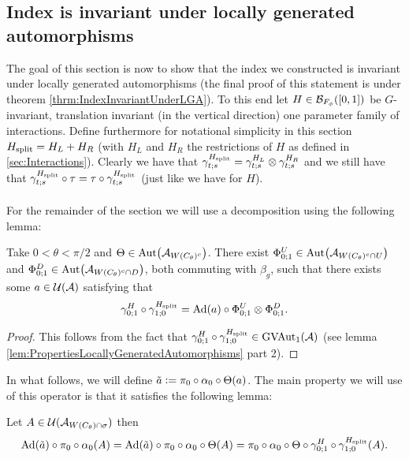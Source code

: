\documentclass[11pt,a4paper,twoside]{article}
\numberwithin{equation}{section}
\begin{document}
\subsection{Index is invariant under locally generated automorphisms}\label{sec:IndexInvariantUnderLGA}
The goal of this section is now to show that the index we constructed is invariant under locally generated automorphisms (the final proof of this statement is under theorem \ref{thrm:IndexInvariantUnderLGA}). To this end let $H\in\mathcal B_{F_\phi}([0,1])$ be $G$-invariant, translation invariant (in the vertical direction) one parameter family of interactions. Define furthermore for notational simplicity in this section ${H_{\text{split}}}=H_L+H_R$ (with $H_L$ and $H_R$ the restrictions of $H$ as defined in \ref{sec:Interactions}). Clearly we have that $\gamma^{{H_{\text{split}}}}_{t;s}=\gamma^{H_L}_{t;s}\otimes\gamma^{H_R}_{t;s}$ and we still have that $\gamma^{{H_{\text{split}}}}_{t;s}\circ\tau=\tau\circ\gamma^{{H_{\text{split}}}}_{t;s}$ (just like we have for $H$).\\\\
For the remainder of the section we will use a decomposition using the following lemma:
\begin{lemma}\label{lem:DefinitionOfGroupMorphismVAutEquation}
	Take $0<\theta<\pi/2$ and $\Theta\in \Aut{\AA_{W(C_\theta)^c}}$. There exist $\Phi^U_{0;1}\in\Aut{\AA_{W(C_\theta)^c\cap U}}$ and $\Phi^D_{0;1}\in\Aut{\AA_{W(C_\theta)^c\cap D}}$, both commuting with $\beta_g$, such that there exists some $a\in\mathcal U(\mathcal A)$ satisfying that
	\begin{equation}\label{eq:DefinitionOfGroupMorphismVAutEquation}
	\gamma^H_{0;1}\circ\gamma^{\Hsplit}_{1;0}=\Ad{a}\circ \Phi^U_{0;1}\otimes\Phi^D_{0;1}.
	\end{equation}
\end{lemma}
\begin{proof}
	This follows from the fact that $\gamma^H_{0;1}\circ\gamma^{{H_{\text{split}}}}_{1;0}\in \textrm{GVAut}_1(\mathcal A)$ (see lemma \ref{lem:PropertiesLocallyGeneratedAutomorphisms} part 2).
\end{proof}
In what follows, we will define $\tilde{a}\vcentcolon= \pi_0\circ\alpha_0\circ\Theta(a)$. The main property we will use of this operator is that it satisfies the following lemma:
\begin{lemma}\label{lem:PropertyTilde_a}
	Let $A\in\mathcal U(\mathcal A_{W(C_\theta)\cap\sigma})$ then
	\begin{equation}
		\Ad{\tilde{a}}\circ\pi_0\circ\alpha_0(A)=\Ad{\tilde{a}}\circ\pi_0\circ\alpha_0\circ\Theta(A)=\pi_0\circ\alpha_0\circ\Theta\circ\gamma^H_{0;1}\circ\gamma^{\Hsplit}_{1;0}(A).
	\end{equation}
\end{lemma}
\end{document}
